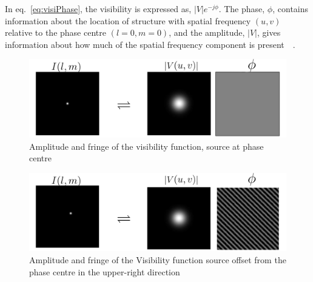 In eq.~\ref{eq:visiPhase}, the visibility is expressed as, $|V|e^{-j\phi}$. The phase, $\phi$, contains information about the location of structure with spatial frequency $(u,v)$ relative to the phase centre $(l=0,m=0)$, and the amplitude, $|V|$, gives information about how much of the spatial frequency component is present~\citep[Slide 8]{jdf.webinar.2}~\citep[Slide 9]{wilner.siw2014}.\\ 
\begin{figure}[htbp]
\center
    \includegraphics[scale= 0.3]{Figures/phase0}
 	\caption[Amplitude and fringe of the visibility function]{Amplitude and fringe of the visibility function, source at phase centre~\citep[Slide 9]{wilner.siw2014}}
	\label{fig:VisiPhase0}
\end{figure}
\begin{figure}[htbp]
\center
    \includegraphics[scale= 0.3]{Figures/phase1}
 	\caption[Amplitude and fringe of the visibility function, where the source is offset the phase centre]{Amplitude and fringe of the Visibility function source offset from the phase centre in the upper-right direction~\citep[Slide 9]{wilner.siw2014}}
	\label{fig:VisiPhase1}
\end{figure}
